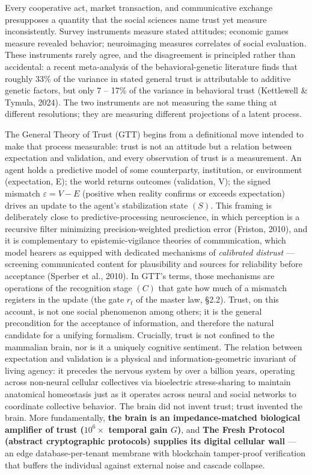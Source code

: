 \documentclass[
]{article}
\begin{document}
Every cooperative act, market transaction, and communicative exchange
presupposes a quantity that the social sciences name trust yet measure
inconsistently. Survey instruments measure stated attitudes; economic
games measure revealed behavior; neuroimaging measures correlates of
social evaluation. These instruments rarely agree, and the disagreement
is principled rather than accidental: a recent meta-analysis of the
behavioral-genetic literature finds that roughly 33\% of the variance in
stated general trust is attributable to additive genetic factors, but
only 7 -- 17\% of the variance in behavioral trust (Kettlewell \&
Tymula, 2024). The two instruments are not measuring the same thing at
different resolutions; they are measuring different projections of a
latent process.

The General Theory of Trust (GTT) begins from a definitional move
intended to make that process measurable: trust is not an attitude but a
relation between expectation and validation, and every observation of
trust is a measurement. An agent holds a predictive model of some
counterparty, institution, or environment (expectation, E); the world
returns outcomes (validation, V); the signed mismatch
\(\varepsilon = V - E\) (positive when reality confirms or exceeds
expectation) drives an update to the agent's stabilization state
\((S).\) This framing is deliberately close to predictive-processing
neuroscience, in which perception is a recursive filter minimizing
precision-weighted prediction error (Friston, 2010), and it is
complementary to epistemic-vigilance theories of communication, which
model hearers as equipped with dedicated mechanisms of \emph{calibrated
distrust} --- screening communicated content for plausibility and
sources for reliability before acceptance (Sperber et al., 2010). In
GTT's terms, those mechanisms are operations of the recognition stage
\((C)\) that gate how much of a mismatch registers in the update (the
gate \(r_t\) of the master law, §2.2). Trust, on this account, is not
one social phenomenon among others; it is the general precondition for
the acceptance of information, and therefore the natural candidate for a
unifying formalism. Crucially, trust is not confined to the mammalian
brain, nor is it a uniquely cognitive sentiment. The relation between
expectation and validation is a physical and information-geometric
invariant of living agency: it precedes the nervous system by over a
billion years, operating across non-neural cellular collectives via
bioelectric stress-sharing to maintain anatomical homeostasis just as it
operates across neural and social networks to coordinate collective
behavior. The brain did not invent trust; trust invented the brain. More
fundamentally, \textbf{the brain is an impedance-matched biological
amplifier of trust (\(10^6\times\) temporal gain \(G\))}, and
\textbf{The Fresh Protocol (abstract cryptographic protocols) supplies
its digital cellular wall} --- an edge database-per-tenant membrane with
blockchain tamper-proof verification that buffers the individual against
external noise and cascade collapse.
\end{document}

